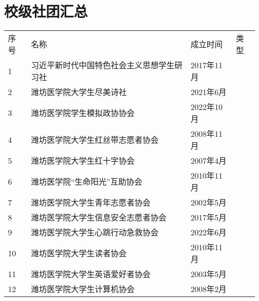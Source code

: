 \chapter[校级社团汇总]{校级社团汇总}
\label{community_summary}

\begin{center}
    \vspace*{4em}
    \begin{tabular}{|>{\centering\arraybackslash}p{2em}|>{\centering\arraybackslash}p{19.5em}|%
        >{\centering\arraybackslash}p{6em}|>{\centering\arraybackslash}p{5em}|}
        \Xhline{1.2pt}
        序号 & 名称                            & 成立时间     & 类型                     \\
        \Xhline{1.2pt}
        1  & \small{习近平新时代中国特色社会主义思想学生研习社} & 2017年11月 & \multirow{3}{*}{思想政治类} \\
        \cline{1-3}
        2  & 潍坊医学院大学生尽美诗社                  & 2021年6月  &                        \\
        \cline{1-3}
        3  & 潍坊医学院学生模拟政协协会                 & 2022年10月 &                        \\
        \Xhline{1.2pt}
        4  & 潍坊医学院大学生红丝带志愿者协会              & 2008年11月 & \multirow{6}{*}{志愿公益类} \\
        \cline{1-3}
        5  & 潍坊医学院大学生红十字协会                 & 2007年4月  &                        \\
        \cline{1-3}
        6  & 潍坊医学院“生命阳光”互助协会               & 2010年11月 &                        \\
        \cline{1-3}
        7  & 潍坊医学院大学生青年志愿者协会               & 2002年5月  &                        \\
        \cline{1-3}
        8  & 潍坊医学院大学生信息安全志愿者协会             & 2017年5月  &                        \\
        \cline{1-3}
        9  & 潍坊医学院大学生心跳行动急救协会              & 2022年6月  &                        \\
        \Xhline{1.2pt}
        10 & 潍坊医学院大学生读者协会                  & 2010年11月 & \multirow{5}{*}{学术科技类} \\
        \cline{1-3}
        11 & 潍坊医学院大学生英语爱好者协会               & 2003年5月  &                        \\
        \cline{1-3}
        12 & 潍坊医学院大学生计算机协会                 & 2008年2月  &                        \\

\end{tabular}
\end{center}
